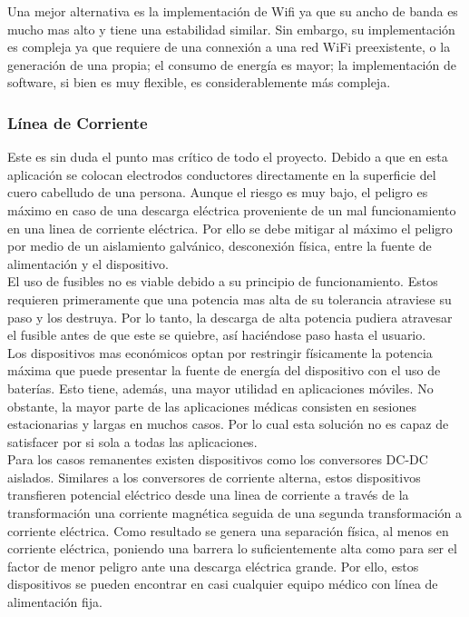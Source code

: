 Una mejor alternativa es la implementación de Wifi ya que su ancho de banda es mucho mas alto y tiene una estabilidad similar. Sin embargo, su implementación es compleja ya que requiere de una connexión a una red WiFi preexistente, o la generación de una propia; el consumo de energía es mayor; la implementación de software, si bien es muy flexible, es considerablemente más compleja.\\

\subsubsection{Línea de Corriente}
\label{sec:orge0e6cea}
Este es sin duda el punto mas crítico de todo el proyecto. Debido a que en esta aplicación se colocan electrodos conductores directamente en la superficie del cuero cabelludo de una persona. Aunque el riesgo es muy bajo, el peligro es máximo en caso de una descarga eléctrica proveniente de un mal funcionamiento en una linea de corriente eléctrica. Por ello se debe mitigar al máximo el peligro por medio de un aislamiento galvánico, desconexión física, entre la fuente de alimentación y el dispositivo.\\

El uso de fusibles no es viable debido a su principio de funcionamiento. Estos requieren primeramente que una potencia mas alta de su tolerancia atraviese su paso y los destruya. Por lo tanto, la descarga de alta potencia pudiera atravesar el fusible antes de que este se quiebre, así haciéndose paso hasta el usuario.\\

Los dispositivos mas económicos optan por restringir físicamente la potencia máxima que puede presentar la fuente de energía del dispositivo con el uso de baterías. Esto tiene, además, una mayor utilidad en aplicaciones móviles. No obstante, la mayor parte de las aplicaciones médicas consisten en sesiones estacionarias y largas en muchos casos. Por lo cual esta solución no es capaz de satisfacer por si sola a todas las aplicaciones.\\

Para los casos remanentes existen dispositivos como los conversores DC-DC aislados. Similares a los conversores de corriente alterna, estos dispositivos transfieren potencial eléctrico desde una linea de corriente a través de la transformación una corriente magnética seguida de una segunda transformación a corriente eléctrica. Como resultado se genera una separación física, al menos en corriente eléctrica, poniendo una barrera lo suficientemente alta como para ser el factor de menor peligro ante una descarga eléctrica grande. Por ello, estos dispositivos se pueden encontrar en casi cualquier equipo médico con línea de alimentación fija.\\


